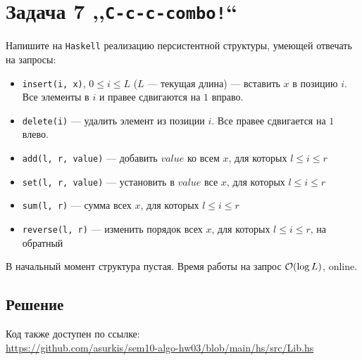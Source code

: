 \section{Задача 7 ,,\texttt{C-c-c-combo!}``}

Напишите на \texttt{Haskell} реализацию персистентной структуры,
умеющей отвечать на запросы:
\begin{itemize}
    \item \texttt{insert(i, x)}, $0 \le i \le L$ ($L$ --- текущая длина) --- вставить $x$ в позицию $i$. Все элементы в $i$ и правее сдвигаются на $1$ вправо.
    \item \texttt{delete(i)} --- удалить элемент из позиции $i$. Все правее сдвигается на $1$ влево.
    \item \texttt{add(l, r, value)} --- добавить $value$ ко всем $x$, для которых $l \le i \le r$
    \item \texttt{set(l, r, value)} --- установить в $value$ все $x$, для которых $l \le i \le r$
    \item \texttt{sum(l, r)} --- сумма всех $x$, для которых $l \le i \le r$
    \item \texttt{reverse(l, r)} --- изменить порядок всех $x$, для которых $l \le i \le r$, на обратный
\end{itemize}

В начальный момент структура пустая. Время работы на запрос $\mathcal{O}(\log{L})$, online.

\subsection{Решение}
Код также доступен по ссылке: \\
\url{https://github.com/asurkis/sem10-algo-hw03/blob/main/hs/src/Lib.hs}

\inputminted{haskell}{hs/src/Lib.hs}
